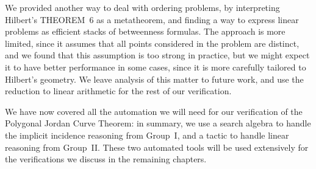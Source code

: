 We provided another way to deal with ordering problems, by interpreting Hilbert's THEOREM~6 as a metatheorem, and finding a way to express linear problems as efficient stacks of betweenness formulas. The approach is more limited, since it assumes that all points considered in the problem are distinct, and we found that this assumption is too strong in practice, but we might expect it to have better performance in some cases, since it is more carefully tailored to Hilbert's geometry. We leave analysis of this matter to future work, and use the reduction to linear arithmetic for the rest of our verification.

We have now covered all the automation we will need for our verification of the Polygonal Jordan Curve Theorem: in summary, we use a search algebra to handle the implicit incidence reasoning from Group~I, and a tactic to handle linear reasoning from Group~II. These two automated tools will be used extensively for the verifications we discuss in the remaining chapters. 

